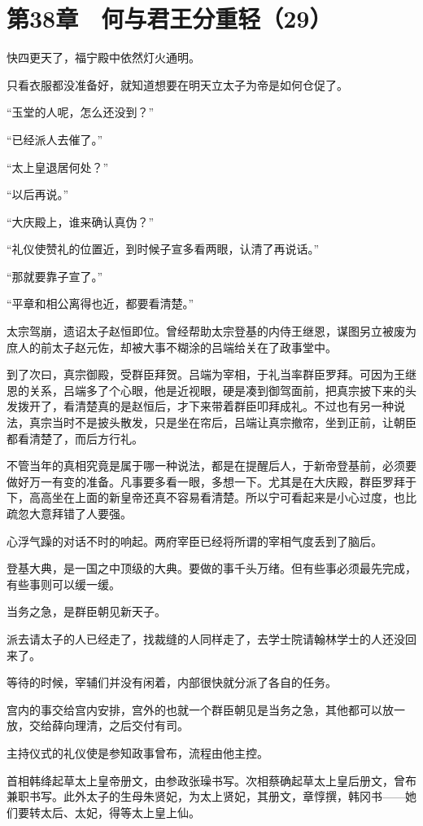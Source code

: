 \section{第38章　何与君王分重轻（29）}

快四更天了，福宁殿中依然灯火通明。

只看衣服都没准备好，就知道想要在明天立太子为帝是如何仓促了。

“玉堂的人呢，怎么还没到？”

“已经派人去催了。”

“太上皇退居何处？”

“以后再说。”

“大庆殿上，谁来确认真伪？”

“礼仪使赞礼的位置近，到时候子宣多看两眼，认清了再说话。”

“那就要靠子宣了。”

“平章和相公离得也近，都要看清楚。”

太宗驾崩，遗诏太子赵恒即位。曾经帮助太宗登基的内侍王继恩，谋图另立被废为庶人的前太子赵元佐，却被大事不糊涂的吕端给关在了政事堂中。

到了次曰，真宗御殿，受群臣拜贺。吕端为宰相，于礼当率群臣罗拜。可因为王继恩的关系，吕端多了个心眼，他是近视眼，硬是凑到御驾面前，把真宗披下来的头发拨开了，看清楚真的是赵恒后，才下来带着群臣叩拜成礼。不过也有另一种说法，真宗当时不是披头散发，只是坐在帘后，吕端让真宗撤帘，坐到正前，让朝臣都看清楚了，而后方行礼。

不管当年的真相究竟是属于哪一种说法，都是在提醒后人，于新帝登基前，必须要做好万一有变的准备。凡事要多看一眼，多想一下。尤其是在大庆殿，群臣罗拜于下，高高坐在上面的新皇帝还真不容易看清楚。所以宁可看起来是小心过度，也比疏忽大意拜错了人要强。

心浮气躁的对话不时的响起。两府宰臣已经将所谓的宰相气度丢到了脑后。

登基大典，是一国之中顶级的大典。要做的事千头万绪。但有些事必须最先完成，有些事则可以缓一缓。

当务之急，是群臣朝见新天子。

派去请太子的人已经走了，找裁缝的人同样走了，去学士院请翰林学士的人还没回来了。

等待的时候，宰辅们并没有闲着，内部很快就分派了各自的任务。

宫内的事交给宫内安排，宫外的也就一个群臣朝见是当务之急，其他都可以放一放，交给薛向理清，之后交付有司。

主持仪式的礼仪使是参知政事曾布，流程由他主控。

首相韩绛起草太上皇帝册文，由参政张璪书写。次相蔡确起草太上皇后册文，曾布兼职书写。此外太子的生母朱贤妃，为太上贤妃，其册文，章惇撰，韩冈书——她们要转太后、太妃，得等太上皇上仙。

